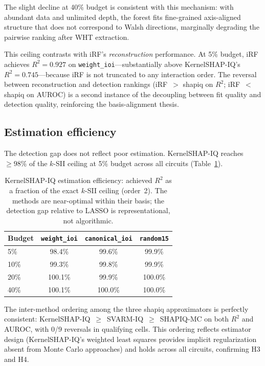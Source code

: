 \documentclass[10pt]{article}
\begin{document}
The slight decline at 40\% budget is consistent with this mechanism:
with abundant data and unlimited depth, the forest fits fine-grained
axis-aligned structure that does not correspond to Walsh directions,
marginally degrading the pairwise ranking after WHT extraction.

This ceiling contrasts with iRF's \emph{reconstruction} performance.
At 5\% budget, iRF achieves $R^2 = 0.927$ on
\texttt{weight\_ioi}---substantially above KernelSHAP-IQ's
$R^2 = 0.745$---because iRF is not truncated to any interaction
order. The reversal between reconstruction and detection rankings
(iRF~$>$ shapiq on $R^2$; iRF~$<$ shapiq on AUROC) is a second
instance of the decoupling between fit quality and detection quality,
reinforcing the basis-alignment thesis.


\subsection{Estimation efficiency}
\label{sec:efficiency}

The detection gap does not reflect poor estimation.
KernelSHAP-IQ reaches $\geq 98\%$ of the $k$-SII ceiling at 5\%
budget across all circuits (Table~\ref{tab:efficiency}).

\begin{table}[t]
\centering
\caption{KernelSHAP-IQ estimation efficiency: achieved $R^2$ as a
fraction of the exact $k$-SII ceiling (order~2). The methods are
near-optimal within their basis; the detection gap relative to
LASSO is representational, not algorithmic.}
\label{tab:efficiency}
\begin{tabular}{lccc}
\toprule
Budget & \texttt{weight\_ioi} & \texttt{canonical\_ioi} & \texttt{random15} \\
\midrule
5\%  & 98.4\% & 99.6\% & 99.9\% \\
10\% & 99.3\% & 99.8\% & 99.9\% \\
20\% & 100.1\% & 99.9\% & 100.0\% \\
40\% & 100.1\% & 100.0\% & 100.0\% \\
\bottomrule
\end{tabular}
\end{table}

The inter-method ordering among the three shapiq approximators is
perfectly consistent: KernelSHAP-IQ~$\geq$~SVARM-IQ~$\geq$~SHAPIQ-MC
on both $R^2$ and AUROC, with 0/9 reversals in qualifying cells.
This ordering reflects estimator design
(KernelSHAP-IQ's weighted least squares provides implicit
regularization absent from Monte Carlo approaches) and holds across
all circuits, confirming H3 and H4.
\end{document}
